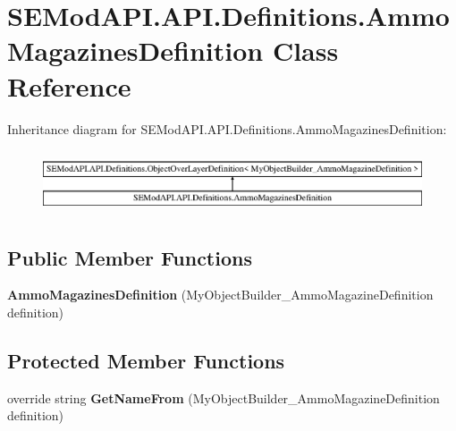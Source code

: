 \hypertarget{class_s_e_mod_a_p_i_1_1_a_p_i_1_1_definitions_1_1_ammo_magazines_definition}{}\section{S\+E\+Mod\+A\+P\+I.\+A\+P\+I.\+Definitions.\+Ammo\+Magazines\+Definition Class Reference}
\label{class_s_e_mod_a_p_i_1_1_a_p_i_1_1_definitions_1_1_ammo_magazines_definition}
Inheritance diagram for S\+E\+Mod\+A\+P\+I.\+A\+P\+I.\+Definitions.\+Ammo\+Magazines\+Definition\+:\begin{figure}[H]
\begin{center}
\leavevmode
\includegraphics[height=1.891892cm]{class_s_e_mod_a_p_i_1_1_a_p_i_1_1_definitions_1_1_ammo_magazines_definition}
\end{center}
\end{figure}
\subsection*{Public Member Functions}
\begin{DoxyCompactItemize}
\item 
\hypertarget{class_s_e_mod_a_p_i_1_1_a_p_i_1_1_definitions_1_1_ammo_magazines_definition_a19ad7b408e456fa5e95cf631efffed30}{}{\bfseries Ammo\+Magazines\+Definition} (My\+Object\+Builder\+\_\+\+Ammo\+Magazine\+Definition definition)\label{class_s_e_mod_a_p_i_1_1_a_p_i_1_1_definitions_1_1_ammo_magazines_definition_a19ad7b408e456fa5e95cf631efffed30}

\end{DoxyCompactItemize}
\subsection*{Protected Member Functions}
\begin{DoxyCompactItemize}
\item 
\hypertarget{class_s_e_mod_a_p_i_1_1_a_p_i_1_1_definitions_1_1_ammo_magazines_definition_ae5c9a12e8445c2abb2d2be7d5979d590}{}override string {\bfseries Get\+Name\+From} (My\+Object\+Builder\+\_\+\+Ammo\+Magazine\+Definition definition)\label{class_s_e_mod_a_p_i_1_1_a_p_i_1_1_definitions_1_1_ammo_magazines_definition_ae5c9a12e8445c2abb2d2be7d5979d590}

\end{DoxyCompactItemize}
